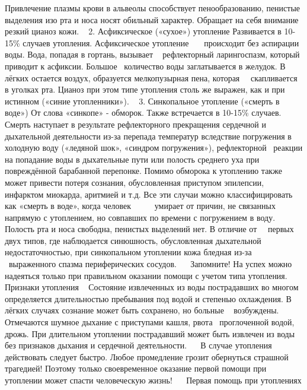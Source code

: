 \documentclass[a4paper, 12pt]{article}
\theoremstyle{definition}
\begin{document}
        Привлечение плазмы крови в альвеолы способствует пенообразованию, пенистые выделения изо рта и носа носят обильный характер. Обращает на себя внимание резкий цианоз кожи.
         
        2. Асфиксическое («сухое») утопление
        Развивается в 10-15\% случаев утопления. Асфиксическое утопление    происходит без аспирации воды. Вода, попадая в гортань, вызывает   рефлекторный ларингоспазм, который приводит к асфиксии. Большое  количество воды заглатывается в желудок.
        В лёгких остается воздух, образуется мелкопузырная пена, которая   скапливается в уголках рта. Цианоз при этом типе утопления столь же выражен, как и при истинном («синие утопленники»).
         
        3. Синкопальное утопление («смерть в воде»)
        От слова «синкопе» - обморок. Также встречается в 10-15\% случаев. Смерть наступает в результате рефлекторного прекращения сердечной и дыхательной деятельности из-за перепада температур вследствие погружения в холодную воду («ледяной шок», «синдром погружения»), рефлекторной  реакции на попадание воды в дыхательные пути или полость среднего уха при повреждённой барабанной перепонке.
        Помимо обморока к утоплению также может привести потеря сознания, обусловленная приступом эпилепсии, инфарктом миокарда, аритмией и т.д. Все эти случаи можно классифицировать как «смерть в воде», когда человек      умирает от причин, не связанных напрямую с утоплением, но совпавших по времени с погружением в воду.
        Полость рта и носа свободна, пенистых выделений нет. В отличие от   первых двух типов, где наблюдается синюшность, обусловленная дыхательной недостаточностью, при синкопальном утоплении кожа бледная из-за  выраженного спазма периферических сосудов.
          
        Запомните!
        На успех можно надеяться только при правильном оказании
        помощи с учетом типа утопления.
        Признаки утопления
         
        Состояние извлеченных из воды пострадавших во многом определяется длительностью пребывания под водой и степенью охлаждения.
        В лёгких случаях сознание может быть сохранено, но больные   возбуждены. Отмечаются шумное дыхание с приступами кашля, рвота  проглоченной водой, дрожь.
        При длительном утоплении пострадавший может быть извлечен из воды без признаков дыхания и сердечной деятельности.
          
        В случае утопления действовать следует быстро.
        Любое промедление грозит обернуться страшной трагедией!
        Поэтому только своевременное оказание первой помощи
        при утоплении может спасти человеческую жизнь!
         
         Первая помощь при утоплениях
         
\end{document}
